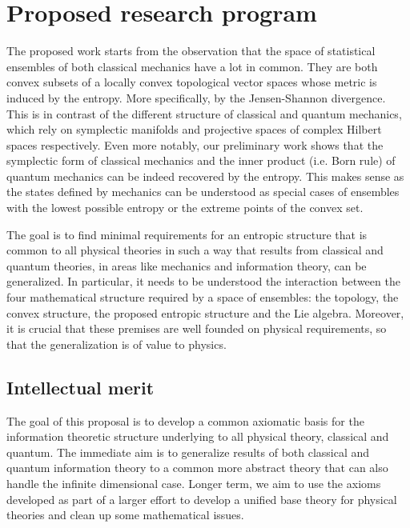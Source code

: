 \section{Proposed research program}

The proposed work starts from the observation that the space of statistical ensembles of both classical mechanics have a lot in common. They are both convex subsets of a locally convex topological vector spaces whose metric is induced by the entropy. More specifically, by the Jensen-Shannon divergence. This is in contrast of the different structure of classical and quantum mechanics, which rely on symplectic manifolds and projective spaces of complex Hilbert spaces respectively. Even more notably, our preliminary work shows that the symplectic form of classical mechanics and the inner product (i.e. Born rule) of quantum mechanics can be indeed recovered by the entropy. This makes sense as the states defined by mechanics can be understood as special cases of ensembles with the lowest possible entropy or the extreme points of the convex set.

The goal is to find minimal requirements for an entropic structure that is common to all physical theories in such a way that results from classical and quantum theories, in areas like mechanics and information theory, can be generalized. In particular, it needs to be understood the interaction between the four mathematical structure required by a space of ensembles: the topology, the convex structure, the proposed entropic structure and the Lie algebra. Moreover, it is crucial that these premises are well founded on physical requirements, so that the generalization is of value to physics.



\subsection{Intellectual merit}

The goal of this proposal is to develop a common axiomatic basis for the information theoretic structure underlying to all physical theory, classical and quantum. The immediate aim is to generalize results of both classical and quantum information theory to a common more abstract theory that can also handle the infinite dimensional case. Longer term, we aim to use the axioms developed as part of a larger effort to develop a unified base theory for physical theories and clean up some mathematical issues.

